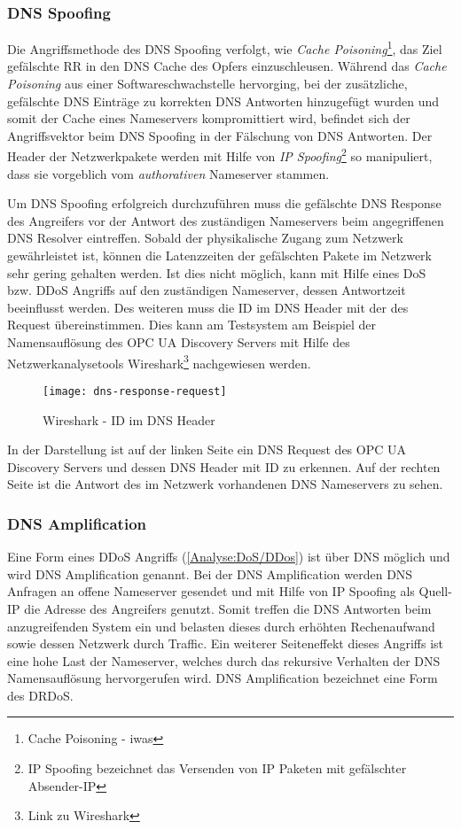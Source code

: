 \subsubsection{\ac{DNS} Spoofing}
Die Angriffsmethode des \ac{DNS} Spoofing verfolgt, wie \textit{Cache Poisoning}\footnote{Cache Poisoning - iwas}, das Ziel gefälschte \ac{RR} in den \ac{DNS} Cache des Opfers einzuschleusen. Während das \textit{Cache Poisoning} aus einer Softwareschwachstelle hervorging, bei der zusätzliche, gefälschte \ac{DNS} Einträge zu korrekten \ac{DNS} Antworten hinzugefügt wurden und somit der Cache eines Nameservers kompromittiert wird, befindet sich der Angriffsvektor beim \ac{DNS} Spoofing in der Fälschung von \ac{DNS} Antworten. Der Header der Netzwerkpakete werden mit Hilfe von \textit{IP Spoofing}\footnote{IP Spoofing bezeichnet das Versenden von IP Paketen mit gefälschter Absender-IP} so manipuliert, dass sie vorgeblich vom \textit{authorativen} Nameserver stammen. 

Um \ac{DNS} Spoofing erfolgreich durchzuführen muss die gefälschte \ac{DNS} Response des Angreifers vor der Antwort des zuständigen Nameservers beim angegriffenen \ac{DNS} Resolver eintreffen. Sobald der physikalische Zugang zum Netzwerk gewährleistet ist, können die Latenzzeiten der gefälschten Pakete im Netzwerk sehr gering gehalten werden. Ist dies nicht möglich, kann mit Hilfe eines \ac{DoS} bzw. \ac{DDoS} Angriffs auf den zuständigen Nameserver, dessen Antwortzeit beeinflusst werden. Des weiteren muss die ID im \ac{DNS} Header mit der des Request übereinstimmen. Dies kann am Testsystem am Beispiel der Namensauflösung des \ac{OPC UA} Discovery Servers mit Hilfe des Netzwerkanalysetools Wireshark\footnote{Link zu Wireshark} nachgewiesen werden.

\begin{figure}[h]
    \centering
    \texttt{[image: dns-response-request]}
    \caption{Wireshark - ID im DNS Header}
    \label{Analyse:DNS Request Response}
  \end{figure}
  
\clearpage

In der Darstellung ist auf der linken Seite ein DNS Request des \ac{OPC UA} Discovery Servers und dessen DNS Header mit ID zu erkennen. Auf der rechten Seite ist die Antwort des im Netzwerk vorhandenen \ac{DNS} Nameservers zu sehen.

\subsubsection{\ac{DNS} Amplification}
Eine Form eines \ac{DDoS} Angriffs (\autoref{Analyse:DoS/DDos}) ist über \ac{DNS} möglich und wird \ac{DNS} Amplification genannt. Bei der \ac{DNS} Amplification werden \ac{DNS} Anfragen an offene Nameserver gesendet und mit Hilfe von \ac{IP} Spoofing als Quell-\ac{IP} die Adresse des Angreifers genutzt. Somit treffen die \ac{DNS} Antworten beim anzugreifenden System ein und belasten dieses durch erhöhten Rechenaufwand sowie dessen Netzwerk durch Traffic. Ein weiterer Seiteneffekt dieses Angriffs ist eine hohe Last der Nameserver, welches durch das rekursive Verhalten der \ac{DNS} Namensauflösung hervorgerufen wird. \ac{DNS} Amplification bezeichnet eine Form des \ac{DRDoS}.

